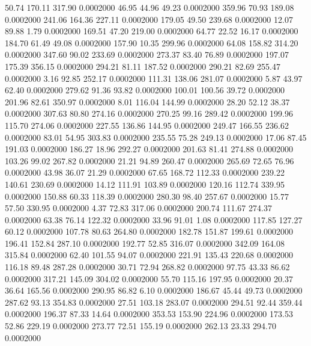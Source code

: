   50.74  170.11  317.90   0.0002000
  46.95   44.96   49.23   0.0002000
 359.96   70.93  189.08   0.0002000
 241.06  164.36  227.11   0.0002000
 179.05   49.50  239.68   0.0002000
  12.07   89.88    1.79   0.0002000
 169.51   47.20  219.00   0.0002000
  64.77   22.52   16.17   0.0002000
 184.70   61.49   49.08   0.0002000
 157.90   10.35  299.96   0.0002000
  64.08  158.82  314.20   0.0002000
 347.60   90.02  233.69   0.0002000
 273.37   83.40   76.89   0.0002000
 197.07  175.39  356.15   0.0002000
 294.21   81.11  187.52   0.0002000
 290.21   82.69  255.47   0.0002000
   3.16   92.85  252.17   0.0002000
 111.31  138.06  281.07   0.0002000
   5.87   43.97   62.40   0.0002000
 279.62   91.36   93.82   0.0002000
 100.01  100.56   39.72   0.0002000
 201.96   82.61  350.97   0.0002000
   8.01  116.04  144.99   0.0002000
  28.20   52.12   38.37   0.0002000
 307.63   80.80  274.16   0.0002000
 270.25   99.16  289.42   0.0002000
 199.96  115.70  274.06   0.0002000
 227.55  136.86  144.95   0.0002000
 249.47  166.55  236.62   0.0002000
  83.01   54.95  303.83   0.0002000
 235.55   75.28  249.13   0.0002000
  17.06   87.45  191.03   0.0002000
 186.27   18.96  292.27   0.0002000
 201.63   81.41  274.88   0.0002000
 103.26   99.02  267.82   0.0002000
  21.21   94.89  260.47   0.0002000
 265.69   72.65   76.96   0.0002000
  43.98   36.07   21.29   0.0002000
  67.65  168.72  112.33   0.0002000
 239.22  140.61  230.69   0.0002000
  14.12  111.91  103.89   0.0002000
 120.16  112.74  339.95   0.0002000
 150.88   60.33  118.39   0.0002000
 280.30   98.40  257.67   0.0002000
  15.77   57.50  330.95   0.0002000
   4.37   72.83  317.06   0.0002000
 200.74  111.67  274.37   0.0002000
  63.38   76.14  122.32   0.0002000
  33.96   91.01    1.08   0.0002000
 117.85  127.27   60.12   0.0002000
 107.78   80.63  264.80   0.0002000
 182.78  151.87  199.61   0.0002000
 196.41  152.84  287.10   0.0002000
 192.77   52.85  316.07   0.0002000
 342.09  164.08  315.84   0.0002000
  62.40  101.55   94.07   0.0002000
 221.91  135.43  220.68   0.0002000
 116.18   89.48  287.28   0.0002000
  30.71   72.94  268.82   0.0002000
  97.75   43.33   86.62   0.0002000
 317.21  145.09  304.02   0.0002000
  55.70  115.16  197.95   0.0002000
  20.37   36.64  165.56   0.0002000
 290.95   86.82    6.10   0.0002000
 186.67   45.44   49.73   0.0002000
 287.62   93.13  354.83   0.0002000
  27.51  103.18  283.07   0.0002000
 294.51   92.44  359.44   0.0002000
 196.37   87.33   14.64   0.0002000
 353.53  153.90  224.96   0.0002000
 173.53   52.86  229.19   0.0002000
 273.77   72.51  155.19   0.0002000
 262.13   23.33  294.70   0.0002000
